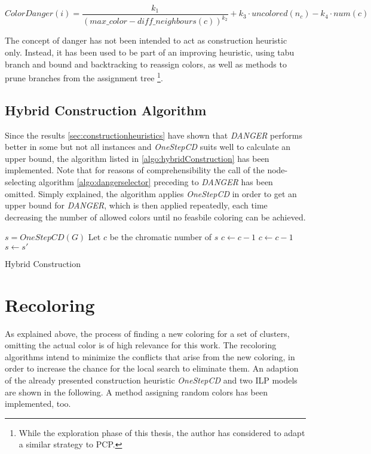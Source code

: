 $$ \mathit{ColorDanger}(i) = \frac{k_1}{(\mathit{max\_color} - \mathit{diff\_neighbours}(c))^{k_2}} + k_3 \cdot \mathit{uncolored}(n_c) - k_4 \cdot num(c) $$

The concept of danger has not been intended to act as construction heuristic only. Instead, it has been used to be part of an improving heuristic, using tabu branch and bound and backtracking to reassign colors, as well as methods to prune branches from the assignment tree \footnote{While the exploration phase of this thesis, the author has considered to adapt a similar strategy to PCP.}.


\subsection{Hybrid Construction Algorithm}

Since the results \ref{sec:constructionheuristics} have shown that \textit{DANGER} performs better in some but not all instances and \textit{OneStepCD} suits well to calculate an upper bound, the algorithm listed in \ref{algo:hybridConstruction} has been implemented. Note that for reasons of comprehensibility the call of the node-selecting algorithm \ref{algo:dangerselector} preceding to \textit{DANGER} has been omitted. Simply explained, the algorithm applies \textit{OneStepCD} in order to get an upper bound for \textit{DANGER}, which is then applied repeatedly, each time decreasing the number of allowed colors until no feasbile coloring can be achieved.

\begin{algorithm}[h]

$s = \mathit{OneStepCD(G)}$\;
Let $c$ be the chromatic number of $s$\;
$c \gets c-1$\; 
 {
	$c \gets c-1$\;
	$s \gets s'$\;
}
\caption{Hybrid Construction}
\label{algo:hybridConstruction}
\end{algorithm}


\section{Recoloring}
\label{sec:recoloring}
As explained above, the process of finding a new coloring for a set of clusters, omitting the actual color is of high relevance for this work. The recoloring algorithms intend to minimize the conflicts that arise from the new coloring, in order to increase the chance for the local search to eliminate them. An adaption of the already presented construction heuristic \textit{OneStepCD} and two ILP models are shown in the following. A method assigning random colors has been implemented, too.

